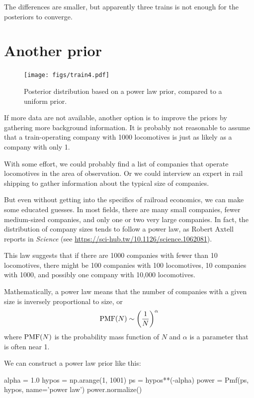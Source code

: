 \documentclass[12pt]{book}
\theoremstyle{exercise}
\begin{document}
The differences are smaller, but apparently three trains is not enough for the posteriors to converge.


\section{Another prior}

\begin{figure}
\centerline{\texttt{[image: figs/train4.pdf]}}
\caption{Posterior distribution based on a power law prior,
compared to a uniform prior.}
\label{fig.train4}
\end{figure}

If more data are not available, another option is to improve the
priors by gathering more background information.
It is probably not reasonable to assume that a train-operating company with 1000 locomotives is just as likely as a company with only 1.

With some effort, we could probably find a list of companies that
operate locomotives in the area of observation.
Or we could interview an expert in rail shipping to gather information about the typical size of companies.

But even without getting into the specifics of railroad economics, we
can make some educated guesses.
In most fields, there are many small
companies, fewer medium-sized companies, and only one or two very
large companies.
In fact, the distribution of company sizes tends to
follow a power law, as Robert Axtell reports in {\it Science} (see
\url{https://sci-hub.tw/10.1126/science.1062081}).



This law suggests that if there are 1000 companies with fewer than
10 locomotives, there might be 100 companies with 100 locomotives,
10 companies with 1000, and possibly one company with 10,000 locomotives.

Mathematically, a power law means that the number of companies
with a given size is inversely proportional to size, or
%
\[ \mathrm{PMF}(N) \sim \left( \frac{1}{N} \right)^{\alpha}   \]
%
where $\mathrm{PMF}(N)$ is the probability mass function of $N$ and $\alpha$ is
a parameter that is often near 1.

We can construct a power law prior like this:

\begin{code}
alpha = 1.0
hypos = np.arange(1, 1001)
ps = hypos**(-alpha)
power = Pmf(ps, hypos, name='power law')
power.normalize()
\end{code}
\end{document}
